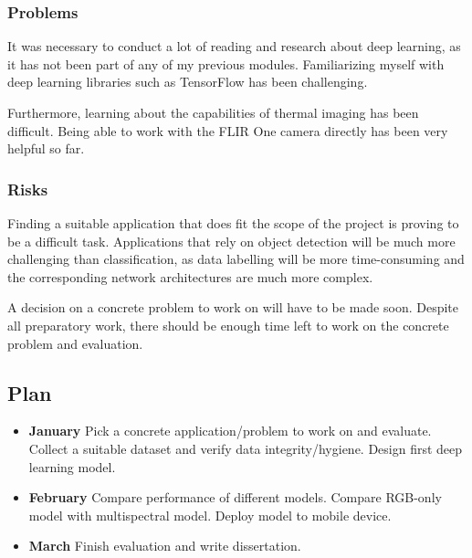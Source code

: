 \documentclass[11pt]{article}
\begin{document}
\subsubsection{Problems}\label{problems}

It was necessary to conduct a lot of reading and research about deep learning, as it has not been part of any of my previous modules. Familiarizing myself with deep learning libraries such as TensorFlow has been challenging.

Furthermore, learning about the capabilities of thermal imaging has been difficult. Being able to work with the FLIR One camera directly has been very helpful so far.

\subsubsection{Risks}\label{risks}

Finding a suitable application that does fit the scope of the project is proving to be a difficult task. 
Applications that rely on object detection will be much more challenging than classification, as data labelling will be more time-consuming and the corresponding network architectures are much more complex.

A decision on a concrete problem to work on will have to be made soon. Despite all preparatory work, there should be enough time left to work on the concrete problem and evaluation.

\subsection{Plan}\label{plan}

\begin{itemize}
    \item \textbf{January} Pick a concrete application/problem to work on and evaluate. Collect a suitable dataset and verify data integrity/hygiene. Design first deep learning model. 
    \item \textbf{February} Compare performance of different models. Compare RGB-only model with multispectral model. Deploy model to mobile device.
    \item \textbf{March} Finish evaluation and write dissertation.
\end{itemize}


    
    
    
\end{document}
